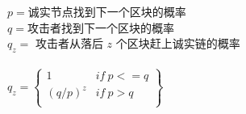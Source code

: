 \documentclass{article}
\begin{document}
$p = $诚实节点找到下一个区块的概率\\
$q = $攻击者找到下一个区块的概率\\
$q_z =$ 攻击者从落后 $z$ 个区块赶上诚实链的概率\\
\\
$q_z = \begin{Bmatrix}
1 & if \ p <= q\\
(q / p)^z & if \ p > q\\
\end{Bmatrix}$
\end{document}
